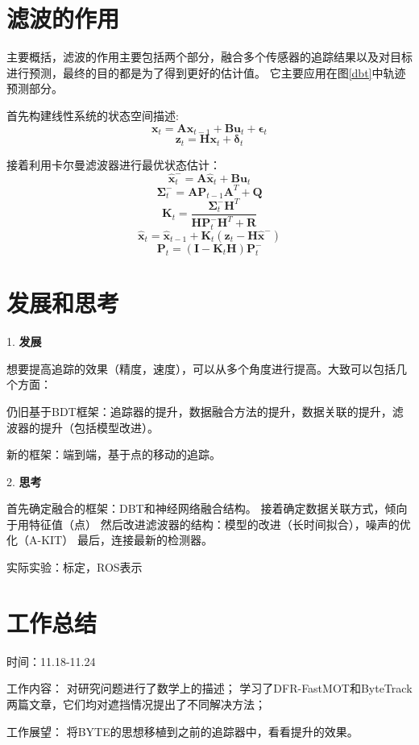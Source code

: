 \section{滤波的作用}
主要概括，滤波的作用主要包括两个部分，融合多个传感器的追踪结果以及对目标进行预测，最终的目的都是为了得到更好的估计值。
它主要应用在图\ref{dbt}中轨迹预测部分。

\begin{tcolorbox}[]
	首先构建线性系统的状态空间描述:
	$$ \mathbf{x}_{t} = \mathbf{A} \mathbf{x}_{t-1} + \mathbf{B} \mathbf{u}_{t} + \bm{\epsilon}_{t} $$
	$$  \mathbf{z}_{t} = \mathbf{H} \mathbf{x}_{t} + \bm{\delta}_{t} $$
	
	接着利用卡尔曼滤波器进行最优状态估计：
	\begin{equation}
		\hat{\bm{x}}_{t}^{-} =  \bm{A} \hat{\bm{x}}_{t} + \bm{B} \bm{u}_t
	\end{equation}
	\begin{equation}
		\bm{\Sigma}_{t}^{-} = \bm{A} \bm{P}_{t-1} \bm{A}^{T} + \bm{Q}
	\end{equation}
	\begin{equation}
		\bm{K}_t = \frac{\bm{\Sigma}_{t}^{-} \bm{H}^{T}}{\bm{H} \bm{P}_{t}^{-} \bm{H}^{T} + \bm{R} }
	\end{equation}
	\begin{equation}
		\hat{\bm{x}}_t = \hat{\bm{x}}_{t-1} + \bm{K}_t(\bm{z}_t - \bm{H} \hat{\bm{x}}^{-})
	\end{equation}
	\begin{equation}
		\bm{P}_t = (\bm{I} - \bm{K}_t \bm{H}) \bm{P}_{t}^{-}
	\end{equation}
	
\end{tcolorbox}

\section{发展和思考}
1. \textbf{发展}

想要提高追踪的效果（精度，速度），可以从多个角度进行提高。大致可以包括几个方面：

仍旧基于BDT框架：追踪器的提升，数据融合方法的提升，数据关联的提升，滤波器的提升（包括模型改进）。

新的框架：端到端\cite{10610979}，基于点的移动的追踪\cite{wu2024moving}。

2. \textbf{思考}

首先确定融合的框架：DBT和神经网络融合结构。
接着确定数据关联方式，倾向于用特征值（点）
然后改进滤波器的结构：模型的改进（长时间拟合），噪声的优化（A-KIT）
最后，连接最新的检测器。

实际实验：标定，ROS表示

\section{工作总结}
时间：11.18-11.24

工作内容：
对研究问题进行了数学上的描述；
学习了DFR-FastMOT和ByteTrack两篇文章，它们均对遮挡情况提出了不同解决方法；

工作展望：
将BYTE的思想移植到之前的追踪器中，看看提升的效果。
